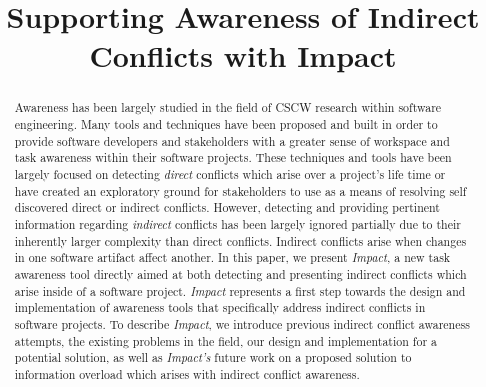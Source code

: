 \documentclass[conference]{IEEEtran}
\begin{document}
\title{Supporting Awareness of Indirect Conflicts with Impact}

\author{
\and
{}
}

\maketitle

\begin{abstract}
Awareness has been largely studied in the field of CSCW research within
software engineering. Many tools and techniques have been proposed and built
in order to provide software developers and stakeholders with a greater
sense of workspace and task awareness within their software projects. These
techniques and tools have been largely focused on detecting \textit{direct} 
conflicts which arise over a project's life time or have created 
an exploratory ground for stakeholders to use as a means of resolving self
discovered direct or indirect conflicts. However, detecting 
and providing pertinent information regarding \textit{indirect} conflicts has been
largely ignored partially due to their inherently larger
complexity than direct conflicts. Indirect conflicts arise when changes
in one software artifact affect another. In this paper, we present
\textit{Impact}, a new task awareness tool directly aimed at both detecting
and presenting indirect conflicts which arise inside of a software project.
\textit{Impact} represents a first step towards the design and implementation
of awareness tools that specifically address indirect conflicts in software
projects. To describe \textit{Impact}, we introduce previous indirect 
conflict awareness attempts, the existing problems in the field, our design 
and implementation for a potential solution, as well as \textit{Impact's} future work
on a proposed solution to information overload which arises with indirect
conflict awareness.
\end{abstract}
\end{document}
